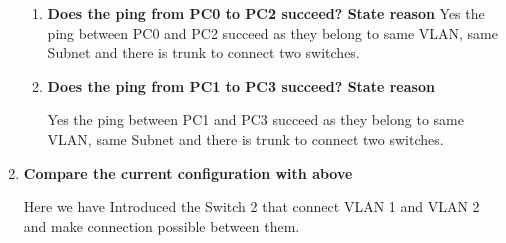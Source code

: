\documentclass[a4paper,11pt]{article}
\begin{document}
\begin{enumerate}
\begin{enumerate}
              \item\textbf{  Does the ping from PC0 to PC2 succeed? State reason}
                    Yes the ping between PC0 and PC2 succeed as they belong to same VLAN, same Subnet and there is trunk to connect two switches.

              \item\textbf{  Does the ping from PC1 to PC3 succeed? State reason}

                    Yes the ping between PC1 and PC3 succeed as they belong to same VLAN, same Subnet and there is trunk to connect two switches.

          \end{enumerate}



    \item\textbf{  Compare the current configuration with above}

          Here we have Introduced the Switch 2 that connect VLAN 1 and VLAN 2 and make connection possible between them.

\end{enumerate}

\pagebreak

%

%

%

%
%

%

%

%


\end{document}
